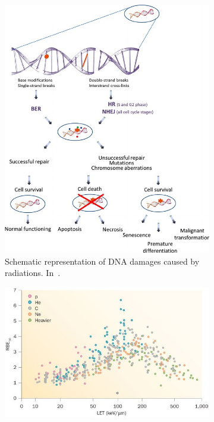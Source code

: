 \begin{figure}
\begin{subfigure}[t]{.4\textwidth}
\centering
\includegraphics[width=0.99\linewidth]{03_GraphicFiles/chapter1_Introduction/DNAdamage.jpg}
\caption{Schematic representation of DNA damages caused by radiations. In~\cite{Arena2014}.}
\label{chap1::fig::DNAdamages}
\end{subfigure}
\begin{subfigure}[t]{.58\textwidth}
\centering
\includegraphics[width=0.99\linewidth]{03_GraphicFiles/chapter1_Introduction/rbeLET.jpg}	

\end{subfigure}
\end{figure}
